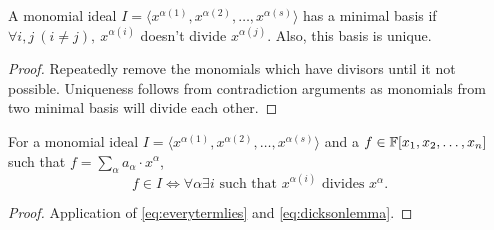 \documentclass[a4paper,11pt]{article}
\begin{document}
\begin{defn}
    A monomial ideal $I=\langle x^{\alpha(1)}, x^{\alpha(2)}, \ldots, x^{\alpha(s)}\rangle$ has a minimal basis if $\forall i,j\ (i\neq j),\ x^{\alpha(i)}$ doesn't divide $x^{\alpha(j)}$. Also, this basis is unique.
\end{defn}
\begin{proof}
    Repeatedly remove the monomials which have divisors until it not possible. Uniqueness follows from contradiction arguments as monomials from two minimal basis will divide each other.
\end{proof}
\begin{theorem}
For a monomial ideal $I=\langle x^{\alpha(1)}, x^{\alpha(2)}, \ldots, x^{\alpha(s)}\rangle$ and a $f\in\mathbb{F}[x_1, x_2, \ldots, x_n]$ such that $f=\displaystyle\sum_{\alpha}a_\alpha \cdot x^\alpha$,
\vspace{-1em}
    \begin{equation}
        f\in I\Leftrightarrow \forall \alpha \exists i \text{ such that } x^{\alpha(i)} \text{ divides } x^\alpha.
    \end{equation}
\end{theorem}
\begin{proof}
    Application of \ref{eq:everytermlies} and \ref{eq:dicksonlemma}.
\end{proof}
\end{document}
